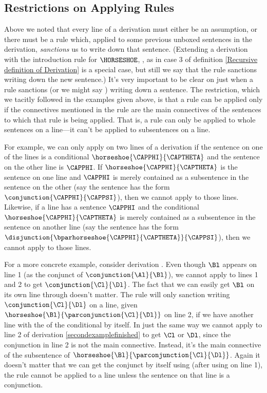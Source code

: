 \subsection{Restrictions on Applying Rules}\label{Restrictions on Applying Rules}
Above we noted that every line of a derivation must either be an assumption, or there must be a rule which, applied to some previous unboxed sentences in the derivation, \emph{sanctions} us to write down that sentence.
(Extending a derivation with the introduction rule for $\HORSESHOE$, , as in case 3 of definition \ref{Recursive definition of Derivation} is a special case, but still we say that the rule sanctions writing down the new sentence.) 
It's very important to be clear on just when a rule sanctions (or we might say ) writing down a sentence. 
The restriction, which we tacitly followed in the examples given above, is that a rule can be applied only if the connectives mentioned in the rule are the main connectives of the sentences to which that rule is being applied. That is, a rule can only be applied to whole sentences on a line---it can't be applied to subsentences on a line.

For example, we can only apply  on two lines of a derivation if the sentence on one of the lines is a conditional $\horseshoe{\CAPPHI}{\CAPTHETA}$ and the sentence on the other line is $\CAPPHI$. 
If $\horseshoe{\CAPPHI}{\CAPTHETA}$ is the sentence on one line and $\CAPPHI$ is merely contained as a subsentence in the sentence on the other (say the sentence has the form $\conjunction{\CAPPHI}{\CAPPSI}$), then we cannot apply  to those lines. 
Likewise, if a line has a sentence $\CAPPHI$ and the conditional $\horseshoe{\CAPPHI}{\CAPTHETA}$ is merely contained as a subsentence in the sentence on another line (say the sentence has the form $\disjunction{\bparhorseshoe{\CAPPHI}{\CAPTHETA}}{\CAPPSI}$), then we cannot apply  to those lines.

For a more concrete example, consider derivation . 
Even though $\Bl$ appears on line 1 (as the conjunct of $\conjunction{\Al}{\Bl}$), we cannot apply  to lines 1 and 2 to get $\conjunction{\Cl}{\Dl}$. 
The fact that we can easily get $\Bl$ on its own line through  doesn't matter. 
The rule  will only sanction writing $\conjunction{\Cl}{\Dl}$ on a line, given $\horseshoe{\Bl}{\parconjunction{\Cl}{\Dl}}$ on line 2, if we have another line with the  of the conditional by itself. 
In just the same way we cannot apply  to line 2 of derivation \ref{secondexamplefinished} to get $\Cl$ or $\Dl$, since the conjunction in line 2 is not the main connective. 
Instead, it's the main connective of the  subsentence of $\horseshoe{\Bl}{\parconjunction{\Cl}{\Dl}}$. 
Again it doesn't matter that we can get the conjunct by itself using  (after using  on line 1), the rule  cannot be applied to a line unless the sentence on that line is a conjunction. 

